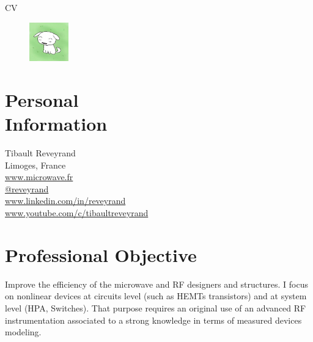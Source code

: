 \documentclass[margin,line]{resume}
\begin{document}
{\sc \Large CV}
\begin{resume}


    \vspace{0.5cm}
    \begin{figure}
         \vspace{-0.9cm}
        \begin{center}
        \includegraphics[width=0.15\textwidth]{profile_image.jpg}
        \end{center}
         \vspace{-1cm}
    \end{figure}

 
    \section{\mysidestyle Personal\\Information}
    Tibault Reveyrand \\
    Limoges, France\\ 
    \faTv  \space \href{http://www.microwave.fr}{www.microwave.fr} \\ 
    \faTwitter  \space \href{https://twitter.com/reveyrand/}{@reveyrand} \\
    \faLinkedin \space \href{http://www.linkedin.com/in/reveyrand/}{www.linkedin.com/in/reveyrand} \\ 
    \faYoutubePlay  \space \href{https://www.youtube.com/c/tibaultreveyrand/}{www.youtube.com/c/tibaultreveyrand}
   

    \section{\mysidestyle Professional Objective}
    Improve the efficiency of the microwave and RF designers and structures. I focus on nonlinear devices at circuits level (such as HEMTs transistors) and at system level (HPA, Switches). That purpose requires an original use of an advanced RF instrumentation associated to a strong knowledge in terms of measured devices modeling.
 

\end{resume}
\end{document}
